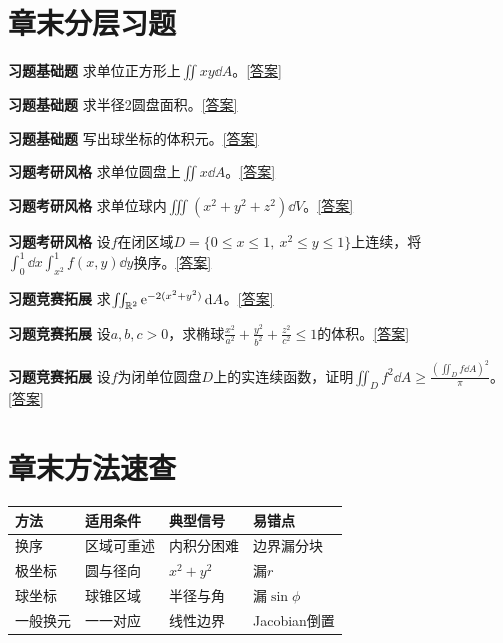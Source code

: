 



\section*{章末分层习题}
\label{q:7:1}\par\noindent\textbf{习题\theexercise\quad 基础题} 求单位正方形上$\iint xy\dd A$。\quad\hyperref[a:7:1]{[答案]}\par
{}\label{q:7:2}\par\noindent\textbf{习题\theexercise\quad 基础题} 求半径2圆盘面积。\quad\hyperref[a:7:2]{[答案]}\par
{}\label{q:7:3}\par\noindent\textbf{习题\theexercise\quad 基础题} 写出球坐标的体积元。\quad\hyperref[a:7:3]{[答案]}\par
{}\label{q:7:4}\par\noindent\textbf{习题\theexercise\quad 考研风格} 求单位圆盘上$\iint x\dd A$。\quad\hyperref[a:7:4]{[答案]}\par
{}\label{q:7:5}\par\noindent\textbf{习题\theexercise\quad 考研风格} 求单位球内$\iiint(x^2+y^2+z^2)\dd V$。\quad\hyperref[a:7:5]{[答案]}\par
{}\label{q:7:6}\par\noindent\textbf{习题\theexercise\quad 考研风格} 设$f$在闭区域$D=\{0\le x\le1,\ x^2\le y\le1\}$上连续，将$\int_0^1\dd x\int_{x^2}^1 f(x,y)\dd y$换序。\quad\hyperref[a:7:6]{[答案]}\par
{}\label{q:7:7}\par\noindent\textbf{习题\theexercise\quad 竞赛拓展} 求$\iint_{\mathbb{R}^2}\mathrm{e}^{-2(x^2+y^2)}\mathop{}\!\mathrm{d} A$。\quad\hyperref[a:7:7]{[答案]}\par
{}\label{q:7:8}\par\noindent\textbf{习题\theexercise\quad 竞赛拓展} 设$a,b,c>0$，求椭球$\frac{x^2}{a^2}+\frac{y^2}{b^2}+\frac{z^2}{c^2}\le1$的体积。\quad\hyperref[a:7:8]{[答案]}\par
{}\label{q:7:9}\par\noindent\textbf{习题\theexercise\quad 竞赛拓展} 设$f$为闭单位圆盘$D$上的实连续函数，证明$\iint_D f^2\dd A\ge\frac{(\iint_D f\dd A)^2}{\pi}$。\quad\hyperref[a:7:9]{[答案]}\par
\section*{章末方法速查}
\par\noindent\begin{tabularx}{\textwidth}{p{23mm}XXX}\toprule 方法&适用条件&典型信号&易错点\\\midrule
换序&区域可重述&内积分困难&边界漏分块\\极坐标&圆与径向&$x^2+y^2$&漏$r$\\球坐标&球锥区域&半径与角&漏$\sin\phi$\\一般换元&一一对应&线性边界&Jacobian倒置\\
\bottomrule\end{tabularx}
